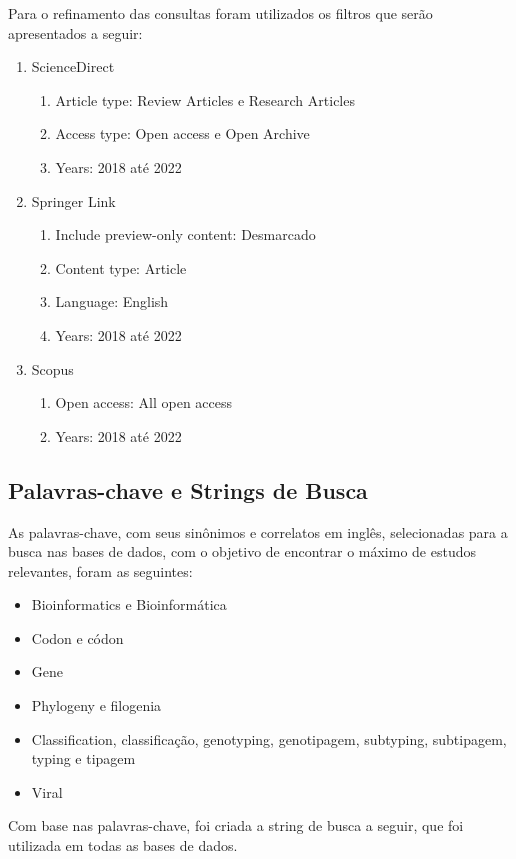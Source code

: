 \documentclass[12pt]{article}
\begin{document}
Para o refinamento das consultas foram utilizados os filtros que serão apresentados a seguir:

\begin{enumerate}
    \item ScienceDirect
          \begin{enumerate}
              \item Article type: Review Articles e Research Articles
              \item Access type: Open access e Open Archive
              \item Years: 2018 até 2022
          \end{enumerate}
    \item Springer Link
          \begin{enumerate}
              \item Include preview-only content: Desmarcado
              \item Content type: Article
              \item Language: English
              \item Years: 2018 até 2022
          \end{enumerate}
    \item Scopus
          \begin{enumerate}
              \item Open access: All open access
              \item Years: 2018 até 2022
          \end{enumerate}
\end{enumerate}


\subsection{Palavras-chave e Strings de Busca}

As palavras-chave, com seus sinônimos e correlatos em inglês, selecionadas para a busca nas bases de dados, com o objetivo de encontrar o máximo de estudos relevantes, foram as seguintes:
\begin{itemize}
    \item{Bioinformatics e Bioinformática}
    \item{Codon e códon}
    \item{Gene}
    \item{Phylogeny e filogenia}
    \item{Classification, classificação, genotyping, genotipagem, subtyping, subtipagem, typing e tipagem}
    \item{Viral}
\end{itemize}
Com base nas palavras-chave, foi criada a string de busca a seguir, que foi utilizada em todas as bases de dados.
\end{document}
